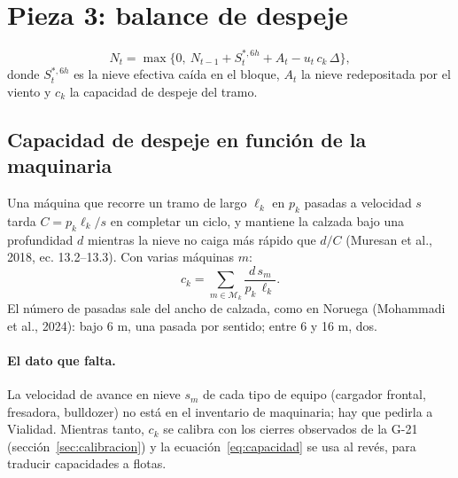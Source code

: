 \section{Pieza 3: balance de despeje}\label{sec:balance}


\begin{equation}
N_t = \max\big\{0,\ N_{t-1} + S^{*,6h}_t + A_t - u_t\, c_k\, \Delta\big\},
\label{eq:balance}
\end{equation}
donde $S^{*,6h}_t$ es la nieve efectiva caída en el bloque, $A_t$ la nieve redepositada por el viento y $c_k$ la capacidad de despeje del tramo.

\subsection{Capacidad de despeje en función de la maquinaria}
Una máquina que recorre un tramo de largo $\ell_k$ en $p_k$ pasadas a velocidad $s$ tarda $C = p_k \ell_k / s$ en completar un ciclo, y mantiene la calzada bajo una profundidad $d$ mientras la nieve no caiga más rápido que $d/C$ (Muresan et al., 2018, ec. 13.2--13.3). Con varias máquinas $m$:
\begin{equation}
c_k = \sum_{m \in \mathcal{M}_k} \frac{d\, s_m}{p_k\, \ell_k} .
\label{eq:capacidad}
\end{equation}
El número de pasadas sale del ancho de calzada, como en Noruega (Mohammadi et al., 2024): bajo 6 m, una pasada por sentido; entre 6 y 16 m, dos.

\paragraph{El dato que falta.} La velocidad de avance en nieve $s_m$ de cada tipo de equipo (cargador frontal, fresadora, bulldozer) no está en el inventario de maquinaria; hay que pedirla a Vialidad. Mientras tanto, $c_k$ se calibra con los cierres observados de la G-21 (sección~\ref{sec:calibracion}) y la ecuación~\eqref{eq:capacidad} se usa al revés, para traducir capacidades a flotas.

